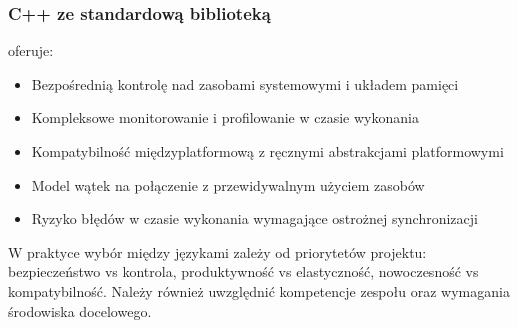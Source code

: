 \subsubsection{C++ ze standardową biblioteką} oferuje:
\begin{itemize}
    \item Bezpośrednią kontrolę nad zasobami systemowymi i układem pamięci
    \item Kompleksowe monitorowanie i profilowanie w czasie wykonania  
    \item Kompatybilność międzyplatformową z ręcznymi abstrakcjami platformowymi
    \item Model wątek na połączenie z przewidywalnym użyciem zasobów
    \item Ryzyko błędów w czasie wykonania wymagające ostrożnej synchronizacji
\end{itemize}

W praktyce wybór między językami zależy od priorytetów projektu: bezpieczeństwo vs kontrola, produktywność vs elastyczność, nowoczesność vs kompatybilność. Należy również uwzględnić kompetencje zespołu oraz wymagania środowiska docelowego.


